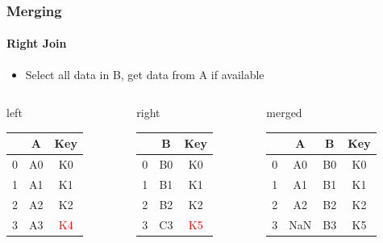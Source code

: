 \documentclass[english]{beamer}
\def\firstcircle{(0,0) circle (2cm)}
\def\secondcircle{(0:3cm) circle (2cm)}
\begin{document}
\begin{frame}
\frametitle{Merging}
\framesubtitle{Right Join}

\begin{itemize}
\item Select all data in B, get data from A if available
\end{itemize}

\begin{center}

\end{center}

{\footnotesize
\begin{columns}
\begin{column}{0.3\textwidth}
left \\
\begin{tabular}{c|cc} \toprule
   & A  &  Key \\ \midrule
0 & A0 &  K0 \\
1 & A1 &  K1 \\ 
2 & A2 &  K2 \\
3 & A3 &  \textcolor{red}{K4} \\ \bottomrule
\end{tabular}
\end{column}
\begin{column}{0.3\textwidth}
right \\
\begin{tabular}{c|cc} \toprule
   &  B   & Key \\ \midrule
0 &  B0 & K0 \\
1 &  B1 & K1 \\ 
2 &  B2 & K2 \\
3 &  C3 & \textcolor{red}{K5} \\ \bottomrule
\end{tabular}\end{column}
\begin{column}{0.3\textwidth}
merged \\
\begin{tabular}{c|ccc} \toprule
   & A  & B   & Key \\ \midrule
0 & A0 & B0 & K0 \\
1 & A1 & B1 & K1 \\ 
2 & A2 & B2 & K2 \\ 
3 & NaN & B3 & K5 \\ \bottomrule
\end{tabular} \\
\vspace*{0.4em}
\end{column}
\end{columns}}

\end{frame}
\end{document}

